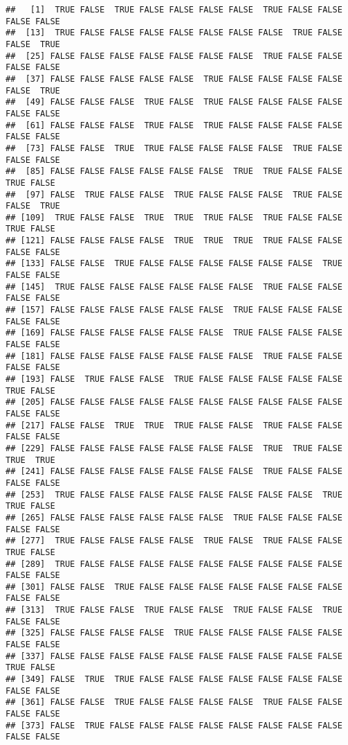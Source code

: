 \documentclass[
]{book}
\begin{document}
\begin{verbatim}
##   [1]  TRUE FALSE  TRUE FALSE FALSE FALSE FALSE  TRUE FALSE FALSE FALSE FALSE
##  [13]  TRUE FALSE FALSE FALSE FALSE FALSE FALSE FALSE  TRUE FALSE FALSE  TRUE
##  [25] FALSE FALSE FALSE FALSE FALSE FALSE FALSE  TRUE FALSE FALSE FALSE FALSE
##  [37] FALSE FALSE FALSE FALSE FALSE  TRUE FALSE FALSE FALSE FALSE FALSE  TRUE
##  [49] FALSE FALSE FALSE  TRUE FALSE  TRUE FALSE FALSE FALSE FALSE FALSE FALSE
##  [61] FALSE FALSE FALSE  TRUE FALSE  TRUE FALSE FALSE FALSE FALSE FALSE FALSE
##  [73] FALSE FALSE  TRUE  TRUE FALSE FALSE FALSE FALSE  TRUE FALSE FALSE FALSE
##  [85] FALSE FALSE FALSE FALSE FALSE FALSE  TRUE  TRUE FALSE FALSE  TRUE FALSE
##  [97] FALSE  TRUE FALSE FALSE  TRUE FALSE FALSE FALSE  TRUE FALSE FALSE  TRUE
## [109]  TRUE FALSE FALSE  TRUE  TRUE  TRUE FALSE  TRUE FALSE FALSE  TRUE FALSE
## [121] FALSE FALSE FALSE FALSE  TRUE  TRUE  TRUE  TRUE FALSE FALSE FALSE FALSE
## [133] FALSE FALSE  TRUE FALSE FALSE FALSE FALSE FALSE FALSE  TRUE FALSE FALSE
## [145]  TRUE FALSE FALSE FALSE FALSE FALSE FALSE  TRUE FALSE FALSE FALSE FALSE
## [157] FALSE FALSE FALSE FALSE FALSE FALSE  TRUE FALSE FALSE FALSE FALSE FALSE
## [169] FALSE FALSE FALSE FALSE FALSE FALSE  TRUE FALSE FALSE FALSE FALSE FALSE
## [181] FALSE FALSE FALSE FALSE FALSE FALSE FALSE  TRUE FALSE FALSE FALSE FALSE
## [193] FALSE  TRUE FALSE FALSE  TRUE FALSE FALSE FALSE FALSE FALSE  TRUE FALSE
## [205] FALSE FALSE FALSE FALSE FALSE FALSE FALSE FALSE FALSE FALSE FALSE FALSE
## [217] FALSE FALSE  TRUE  TRUE  TRUE FALSE FALSE  TRUE FALSE FALSE FALSE FALSE
## [229] FALSE FALSE FALSE FALSE FALSE FALSE FALSE  TRUE  TRUE FALSE  TRUE  TRUE
## [241] FALSE FALSE FALSE FALSE FALSE FALSE FALSE  TRUE FALSE FALSE FALSE FALSE
## [253]  TRUE FALSE FALSE FALSE FALSE FALSE FALSE FALSE FALSE  TRUE  TRUE FALSE
## [265] FALSE FALSE FALSE FALSE FALSE FALSE  TRUE FALSE FALSE FALSE FALSE FALSE
## [277]  TRUE FALSE FALSE FALSE FALSE  TRUE FALSE  TRUE FALSE FALSE  TRUE FALSE
## [289]  TRUE FALSE FALSE FALSE FALSE FALSE FALSE FALSE FALSE FALSE FALSE FALSE
## [301] FALSE FALSE  TRUE FALSE FALSE FALSE FALSE FALSE FALSE FALSE FALSE FALSE
## [313]  TRUE FALSE FALSE  TRUE FALSE FALSE  TRUE FALSE FALSE  TRUE FALSE FALSE
## [325] FALSE FALSE FALSE FALSE  TRUE FALSE FALSE FALSE FALSE FALSE FALSE FALSE
## [337] FALSE FALSE FALSE FALSE FALSE FALSE FALSE FALSE FALSE FALSE  TRUE FALSE
## [349] FALSE  TRUE  TRUE FALSE FALSE FALSE FALSE FALSE FALSE FALSE FALSE FALSE
## [361] FALSE FALSE  TRUE FALSE FALSE FALSE FALSE  TRUE FALSE FALSE FALSE FALSE
## [373] FALSE  TRUE FALSE FALSE FALSE FALSE FALSE FALSE FALSE FALSE FALSE FALSE

\end{verbatim}
\end{document}
